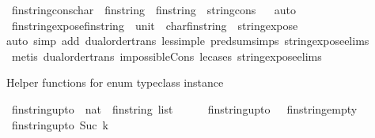 \begin{isabellebody}
\isanewline
{}\isamarkupfalse%
\ fin{\isacharunderscore}string{\isacharunderscore}cons{\isacharcolon}{\isacharcolon}{\isachardoublequoteopen}char\ {\isasymRightarrow}\ fin{\isacharunderscore}string\ {\isasymRightarrow}\ fin{\isacharunderscore}string{\isachardoublequoteclose}\ \ {\isachardoublequoteopen}string{\isacharunderscore}cons{\isachardoublequoteclose}%
\isadelimproof
\ %
\endisadelimproof
%
\isatagproof
{}\isamarkupfalse%
\ auto%
\endisatagproof
{\isafoldproof}%
%
\isadelimproof
%
\endisadelimproof
\isanewline
{}\isamarkupfalse%
\ fin{\isacharunderscore}string{\isacharunderscore}expose{\isacharcolon}{\isacharcolon}{\isachardoublequoteopen}fin{\isacharunderscore}string\ {\isasymRightarrow}\ {\isacharparenleft}unit\ {\isacharplus}\ {\isacharparenleft}char{\isacharasterisk}fin{\isacharunderscore}string{\isacharparenright}{\isacharparenright}{\isachardoublequoteclose}\ \ string{\isacharunderscore}expose\ \isanewline
%
\isadelimproof
\ \ %
\endisadelimproof
%
\isatagproof
{}\isamarkupfalse%
{\isacharparenleft}auto\ simp\ add{\isacharcolon}\ dual{\isacharunderscore}order{\isachardot}trans\ less{\isacharunderscore}imp{\isacharunderscore}le\ pred{\isacharunderscore}sum{\isachardot}simps\ string{\isacharunderscore}expose{\isachardot}elims{\isacharparenright}\isanewline
\ \ \isamarkupfalse%
\ {\isacharparenleft}metis\ dual{\isacharunderscore}order{\isachardot}trans\ impossible{\isacharunderscore}Cons\ le{\isacharunderscore}cases\ string{\isacharunderscore}expose{\isachardot}elims{\isacharparenright}%
\endisatagproof
{\isafoldproof}%
%
\isadelimproof
%
\endisadelimproof
%
\begin{isamarkuptext}%
Helper functions for enum typeclass instance%
\end{isamarkuptext}\isamarkuptrue%
\isamarkupfalse%
\ fin{\isacharunderscore}string{\isacharunderscore}upto\ {\isacharcolon}{\isacharcolon}\ {\isachardoublequoteopen}nat\ {\isasymRightarrow}\ fin{\isacharunderscore}string\ list{\isachardoublequoteclose}\isanewline
\ \ \ \isanewline
\ \ {\isachardoublequoteopen}fin{\isacharunderscore}string{\isacharunderscore}upto\ {}\ {\isacharequal}\ {\isacharbrackleft}fin{\isacharunderscore}string{\isacharunderscore}empty{\isacharbrackright}{\isachardoublequoteclose}\isanewline
{\isacharbar}\ {\isachardoublequoteopen}fin{\isacharunderscore}string{\isacharunderscore}upto\ {\isacharparenleft}Suc\ k{\isacharparenright}\ {\isacharequal}\ \isanewline

\end{isabellebody}

